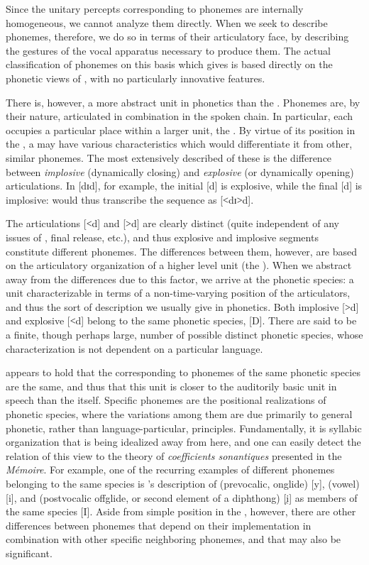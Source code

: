 Since the unitary percepts corresponding to phonemes are internally
homogeneous, we cannot analyze them directly. When we seek to describe
phonemes, therefore, we do so in terms of their articulatory face, by
describing the gestures of the vocal apparatus necessary to produce
them. The actual classification of phonemes on this basis which
{\Saussure} gives is based directly on the phonetic views of {\Jespersen},
with no particularly innovative features.

There is, however, a more abstract unit in phonetics than the
. Pho\-nemes are, by their nature, articulated in combination in
the spoken chain. In particular, each  occupies a particular
place within a larger unit, the . By virtue of its position in
the , a  may have various characteristics which would
differentiate it from other, similar phonemes. The most extensively
described of these is the difference between \emph{implosive} (dynamically
closing) and \emph{explosive} (or dynamically opening) articulations. In
 [dɪd], for example, the initial [d] is explosive, while the
final [d] is implosive: {\Saussure} would thus transcribe the sequence as
[˂dɪ˃d].

The articulations [˂d] and [˃d] are clearly distinct (quite
independent of any issues of , final release, etc.), and thus
explosive and implosive segments constitute different phonemes. The
differences between them, however, are based on the articulatory
organization of a higher level unit (the ). When we abstract
away from the differences due to this factor, we arrive at the
phonetic species: a unit characterizable in terms of a
non-time-varying position of the articulators, and thus the sort of
description we usually give in phonetics. Both implosive [˃d] and
explosive [˂d] belong to the same phonetic species, [D]. There are
said to be a finite, though perhaps large, number of possible distinct
phonetic species, whose characterization is not dependent on a
particular language.

{\Saussure} appears to hold that the  corresponding
to pho\-nemes of the same phonetic species are the same, and thus that
this unit is closer to the auditorily basic unit in speech than the
 itself. Specific phonemes are the positional realizations of
phonetic species, where the variations among them are due primarily to
general phonetic, rather than language-particular,
principles. Fundamentally, it is syllabic organization that is being
idealized away from here, and one can easily detect the relation of
this view to the theory of \emph{coefficients sonantiques} presented in the
\textsl{Mémoire}. For example, one of the recurring examples of different
phonemes belonging to the same species is {\Saussure}'s description of
(prevocalic, onglide) [y], (vowel) [i], and (postvocalic off\-glide, or
second element of a diphthong) [i̯] as members of the same species
[I]. Aside from simple position in the , however, there are
other differences between phonemes that depend on their implementation
in combination with other specific neighboring phonemes, and that may
also be significant.

